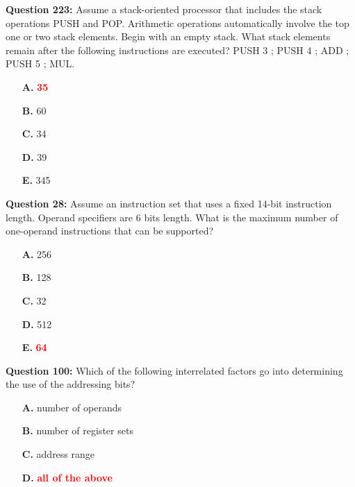 \documentclass[12pt,a4paper]{article}
\begin{document}
\textbf{Question 223:} Assume a stack-oriented processor that includes the stack operations PUSH and POP. Arithmetic operations automatically involve the top one or two stack elements. Begin with an empty stack. What stack elements remain after the following instructions are executed? PUSH 3 ; PUSH 4 ; ADD ; PUSH 5 ; MUL.

\begin{itemize}
    \item[\textbf{A.}] \textcolor{red}{\textbf{35}}
    \item[\textbf{B.}] 60
    \item[\textbf{C.}] 34
    \item[\textbf{D.}] 39
    \item[\textbf{E.}] 345
\end{itemize}

\vspace{0.5cm}

\vspace{0.5cm}

\textbf{Question 28:} Assume an instruction set that uses a fixed 14-bit instruction length. Operand specifiers are 6 bits length. What is the maximum number of one-operand instructions that can be supported?

\begin{itemize}
    \item[\textbf{A.}] 256
    \item[\textbf{B.}] 128
    \item[\textbf{C.}] 32
    \item[\textbf{D.}] 512
    \item[\textbf{E.}] \textcolor{red}{\textbf{64}}
\end{itemize}

\vspace{0.5cm}

\vspace{0.5cm}

\textbf{Question 100:} Which of the following interrelated factors go into determining the use of the addressing bits?

\begin{itemize}
    \item[\textbf{A.}] number of operands
    \item[\textbf{B.}] number of register sets
    \item[\textbf{C.}] address range
    \item[\textbf{D.}] \textcolor{red}{\textbf{all of the above}}
\end{itemize}
\end{document}
